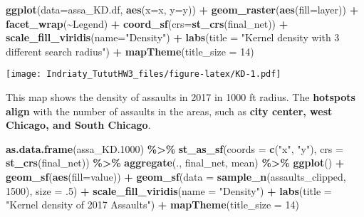 \documentclass[
]{article}
\newenvironment{Shaded}{\begin{snugshade}}{\end{snugshade}}
\newcommand{\AttributeTok}[1]{\textcolor[rgb]{0.13,0.29,0.53}{#1}}
\newcommand{\DecValTok}[1]{\textcolor[rgb]{0.00,0.00,0.81}{#1}}
\newcommand{\FloatTok}[1]{\textcolor[rgb]{0.00,0.00,0.81}{#1}}
\newcommand{\FunctionTok}[1]{\textcolor[rgb]{0.13,0.29,0.53}{\textbf{#1}}}
\newcommand{\NormalTok}[1]{#1}
\newcommand{\SpecialCharTok}[1]{\textcolor[rgb]{0.81,0.36,0.00}{\textbf{#1}}}
\newcommand{\StringTok}[1]{\textcolor[rgb]{0.31,0.60,0.02}{#1}}
\begin{document}
\begin{Shaded}
\begin{Highlighting}[]
\FunctionTok{ggplot}\NormalTok{(}\AttributeTok{data=}\NormalTok{assa\_KD.df, }\FunctionTok{aes}\NormalTok{(}\AttributeTok{x=}\NormalTok{x, }\AttributeTok{y=}\NormalTok{y)) }\SpecialCharTok{+}
  \FunctionTok{geom\_raster}\NormalTok{(}\FunctionTok{aes}\NormalTok{(}\AttributeTok{fill=}\NormalTok{layer)) }\SpecialCharTok{+} 
  \FunctionTok{facet\_wrap}\NormalTok{(}\SpecialCharTok{\textasciitilde{}}\NormalTok{Legend) }\SpecialCharTok{+}
  \FunctionTok{coord\_sf}\NormalTok{(}\AttributeTok{crs=}\FunctionTok{st\_crs}\NormalTok{(final\_net)) }\SpecialCharTok{+} 
  \FunctionTok{scale\_fill\_viridis}\NormalTok{(}\AttributeTok{name=}\StringTok{"Density"}\NormalTok{) }\SpecialCharTok{+}
  \FunctionTok{labs}\NormalTok{(}\AttributeTok{title =} \StringTok{"Kernel density with 3 different search radius"}\NormalTok{) }\SpecialCharTok{+}
  \FunctionTok{mapTheme}\NormalTok{(}\AttributeTok{title\_size =} \DecValTok{14}\NormalTok{)}
\end{Highlighting}
\end{Shaded}

\texttt{[image: Indriaty\_TututHW3\_files/figure-latex/KD-1.pdf]}

This map shows the density of assaults in 2017 in 1000 ft radius. The
\textbf{hotspots} \textbf{align} with the number of assaults in the
areas, such as \textbf{city center, west Chicago, and South Chicago}.

\begin{Shaded}
\begin{Highlighting}[]
\FunctionTok{as.data.frame}\NormalTok{(assa\_KD}\FloatTok{.1000}\NormalTok{) }\SpecialCharTok{\%\textgreater{}\%}
  \FunctionTok{st\_as\_sf}\NormalTok{(}\AttributeTok{coords =} \FunctionTok{c}\NormalTok{(}\StringTok{"x"}\NormalTok{, }\StringTok{"y"}\NormalTok{), }\AttributeTok{crs =} \FunctionTok{st\_crs}\NormalTok{(final\_net)) }\SpecialCharTok{\%\textgreater{}\%}
  \FunctionTok{aggregate}\NormalTok{(., final\_net, mean) }\SpecialCharTok{\%\textgreater{}\%}
   \FunctionTok{ggplot}\NormalTok{() }\SpecialCharTok{+}
     \FunctionTok{geom\_sf}\NormalTok{(}\FunctionTok{aes}\NormalTok{(}\AttributeTok{fill=}\NormalTok{value)) }\SpecialCharTok{+}
     \FunctionTok{geom\_sf}\NormalTok{(}\AttributeTok{data =} \FunctionTok{sample\_n}\NormalTok{(assaults\_clipped, }\DecValTok{1500}\NormalTok{), }\AttributeTok{size =}\NormalTok{ .}\DecValTok{5}\NormalTok{) }\SpecialCharTok{+}
     \FunctionTok{scale\_fill\_viridis}\NormalTok{(}\AttributeTok{name =} \StringTok{"Density"}\NormalTok{) }\SpecialCharTok{+}
     \FunctionTok{labs}\NormalTok{(}\AttributeTok{title =} \StringTok{"Kernel density of 2017 Assaults"}\NormalTok{) }\SpecialCharTok{+}
     \FunctionTok{mapTheme}\NormalTok{(}\AttributeTok{title\_size =} \DecValTok{14}\NormalTok{)}
\end{Highlighting}
\end{Shaded}
\end{document}
